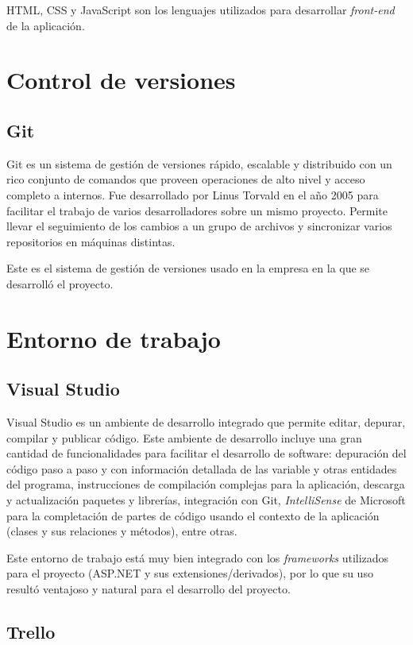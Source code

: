 HTML, CSS y JavaScript son los lenguajes utilizados para desarrollar \textit{front-end} de la aplicación.


\section{Control de versiones}
\subsection{Git}
Git es un sistema de gestión de versiones rápido, escalable y distribuido con un rico conjunto de comandos que proveen operaciones de alto nivel y acceso completo a internos. \cite{gitGit} Fue desarrollado por Linus Torvald en el año 2005 para facilitar el trabajo de varios desarrolladores sobre un mismo proyecto. Permite llevar el seguimiento de los cambios a un grupo de archivos y sincronizar varios repositorios en máquinas distintas.

Este es el sistema de gestión de versiones usado en la empresa en la que se desarrolló el proyecto.

\section{Entorno de trabajo}
\subsection{Visual Studio}
Visual Studio es un ambiente de desarrollo integrado que permite editar, depurar, compilar y publicar código. \cite{visualStudioMicrosoft} Este ambiente de desarrollo incluye una gran cantidad de funcionalidades para facilitar el desarrollo de software: depuración del código paso a paso y con información detallada de las variable y otras entidades del programa, instrucciones de compilación complejas para la aplicación, descarga y actualización paquetes y librerías, integración con Git, \textit{IntelliSense} de Microsoft para la completación de partes de código usando el contexto de la aplicación (clases y sus relaciones y métodos), entre otras.

Este entorno de trabajo está muy bien integrado con los \textit{frameworks} utilizados para el proyecto (ASP.NET y sus extensiones/derivados), por lo que su uso resultó ventajoso y natural para el desarrollo del proyecto.

\subsection{Trello}
